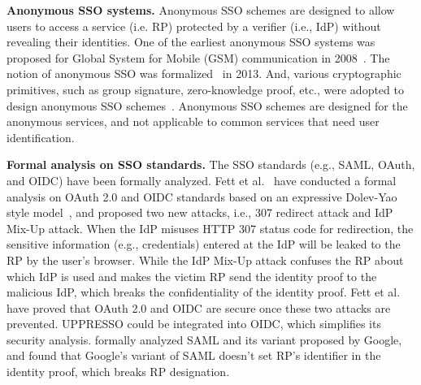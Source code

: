 \noindent\textbf{Anonymous SSO systems.}
Anonymous SSO schemes are designed to allow users to access a service (i.e. RP) protected by a verifier (i.e., IdP) without revealing their identities.
One of the earliest anonymous SSO systems was proposed for Global System for Mobile (GSM) communication in 2008~\cite{ElmuftiWRR08}.
The notion of anonymous SSO was formalized~\cite{WangWS13} in 2013.
And, various cryptographic primitives, such as group signature, zero-knowledge proof, etc., were adopted to design anonymous SSO schemes~\cite{WangWS13,HanCSTW18}.
Anonymous SSO schemes are designed for the anonymous services, and not applicable to common services that need user identification.



\noindent\textbf{Formal analysis on SSO standards.}
The SSO standards (e.g., SAML, OAuth, and OIDC) have been formally analyzed.
Fett et al.~\cite{FettKS16, FettKS17} have conducted a formal analysis on OAuth 2.0 and OIDC standards based on an expressive Dolev-Yao style model~\cite{FettKS14},
and proposed two new attacks, i.e., 307 redirect attack and IdP Mix-Up attack.
When the IdP misuses HTTP 307 status code for redirection, the sensitive information (e.g., credentials) entered at the IdP will  be leaked to the RP by the user's browser.
While the IdP Mix-Up attack confuses the RP about which IdP is used and makes the victim RP send the identity proof to the malicious IdP, which breaks the confidentiality of the identity proof.
Fett et al.~\cite{FettKS16, FettKS17} have proved that OAuth 2.0 and OIDC are secure once these two attacks are prevented. UPPRESSO could be integrated into OIDC, which simplifies its security analysis.
\cite{ArmandoCCCT08} formally analyzed SAML and its variant proposed by Google, and found that Google's variant of SAML doesn't set RP's identifier in the identity proof, which breaks RP designation.

\begin{comment}
\noindent\textbf{Single sign-off.} In SSO systems, once a user's IdP account is compromised, the adversary could hijack all her RPs' accounts.
A backwards-compatible extension, named single sign-off, is proposed for OIDC.
The single sign-off  allows the user to revoke all her identity proofs and notify all RPs to freeze her accounts~\cite{GhasemisharifRC18}.
The single sign-off could also be achieved in UPPRESSO, where the user needs to revoke the identity proofs at all RPs, as the IdP doesn't know which RPs the user visits.
\end{comment}


